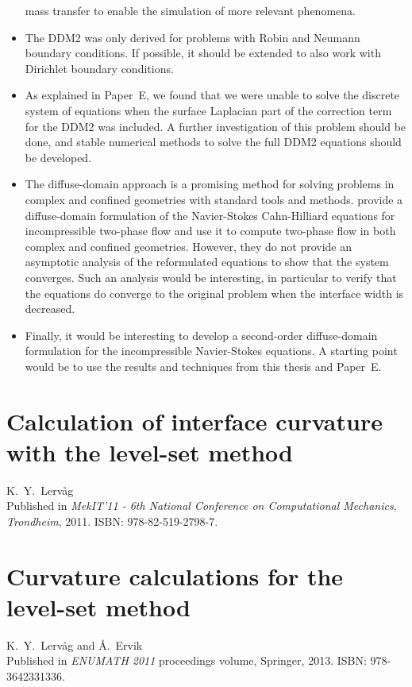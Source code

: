 \documentclass[11pt,b5paper,DIV=calc,BCOR1.3cm,headings=small,%
               footinclude=false,headsepline]{scrbook}
\begin{document}
\begin{itemize}
    mass transfer to enable the simulation of more relevant phenomena.
  \item The DDM2 was only derived for problems with Robin and Neumann boundary
    conditions.  If possible, it should be extended to also work with Dirichlet
    boundary conditions.
  \item As explained in Paper~E, we found that we were unable to solve the
    discrete system of equations when the surface Laplacian part of the
    correction term for the DDM2 was included.  A further investigation of this
    problem should be done, and stable numerical methods to solve the full DDM2
    equations should be developed.
  \item The diffuse-domain approach is a promising method for solving problems
    in complex and confined geometries with standard tools and methods.
    \citet{Aland10} provide a diffuse-domain formulation of the Navier-Stokes
    Cahn-Hilliard equations for incompressible two-phase flow and use it to
    compute two-phase flow in both complex and confined geometries.  However,
    they do not provide an asymptotic analysis of the reformulated equations to
    show that the system converges.  Such an analysis would be interesting, in
    particular to verify that the equations do converge to the original problem
    when the interface width is decreased.
  \item Finally, it would be interesting to develop a second-order
    diffuse-domain formulation for the incompressible Navier-Stokes equations.
    A starting point would be to use the results and techniques from this
    thesis and Paper~E.
\end{itemize}

\printbibliography
{}

\appendix

\chapter{Calculation of interface curvature with the level-set method}
K.\ Y.\ Lervåg\\
Published in \emph{MekIT'11 - 6th National Conference on Computational
  Mechanics, Trondheim}, 2011.  ISBN: 978-82-519-2798-7.

\cleardoublepage


\chapter{Curvature calculations for the level-set method}
K.\ Y.\ Lervåg and Å.\ Ervik\\
Published in \emph{ENUMATH 2011} proceedings volume, Springer, 2013.  ISBN:
978-3642331336.
\end{document}
